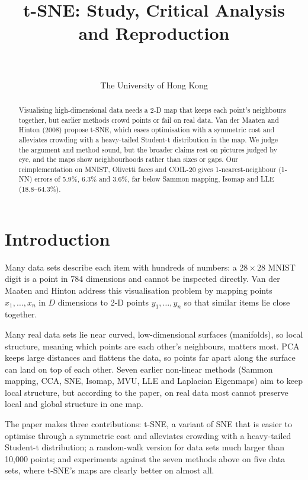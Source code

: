 \documentclass{article}
\title{t-SNE: Study, Critical Analysis and Reproduction}
\author{%
  \makebox[0.36\linewidth]{Jelisaveta Vasiljevic}\makebox[0.36\linewidth]{Alexandre Bommensath} \\
  \makebox[0.36\linewidth]{\textbf{Anna Claire Breuss-Burgess}}\makebox[0.36\linewidth]{\textbf{Adel Kussainova}} \\
  The University of Hong Kong
}
\begin{document}
\maketitle

\begin{abstract}
  Visualising high-dimensional data needs a 2-D map that keeps each point's neighbours together, but earlier methods crowd points or fail on real data. Van der Maaten and Hinton (2008) propose t-SNE, which eases optimisation with a symmetric cost and alleviates crowding with a heavy-tailed Student-t distribution in the map. We judge the argument and method sound, but the broader claims rest on pictures judged by eye, and the maps show neighbourhoods rather than sizes or gaps. Our reimplementation on MNIST, Olivetti faces and COIL-20 gives 1-nearest-neighbour (1-NN) errors of 5.9\%, 6.3\% and 3.6\%, far below Sammon mapping, Isomap and LLE (18.8--64.3\%).
\end{abstract}

\section{Introduction}
\label{sec:intro}

Many data sets describe each item with hundreds of numbers: a $28 \times 28$ MNIST digit is a point in 784 dimensions and cannot be inspected directly. Van der Maaten and Hinton \cite{vandermaaten2008} address this visualisation problem by mapping points $x_1, \dots, x_n$ in $D$ dimensions to 2-D points $y_1, \dots, y_n$ so that similar items lie close together.

Many real data sets lie near curved, low-dimensional surfaces (manifolds), so local structure, meaning which points are each other's neighbours, matters most. PCA keeps large distances and flattens the data, so points far apart along the surface can land on top of each other. Seven earlier non-linear methods (Sammon mapping, CCA, SNE, Isomap, MVU, LLE and Laplacian Eigenmaps) aim to keep local structure, but according to the paper, on real data most cannot preserve local and global structure in one map.

The paper makes three contributions: t-SNE, a variant of SNE \cite{hinton2002} that is easier to optimise through a symmetric cost and alleviates crowding with a heavy-tailed Student-t distribution; a random-walk version for data sets much larger than 10,000 points; and experiments against the seven methods above on five data sets, where t-SNE's maps are clearly better on almost all.
\end{document}
